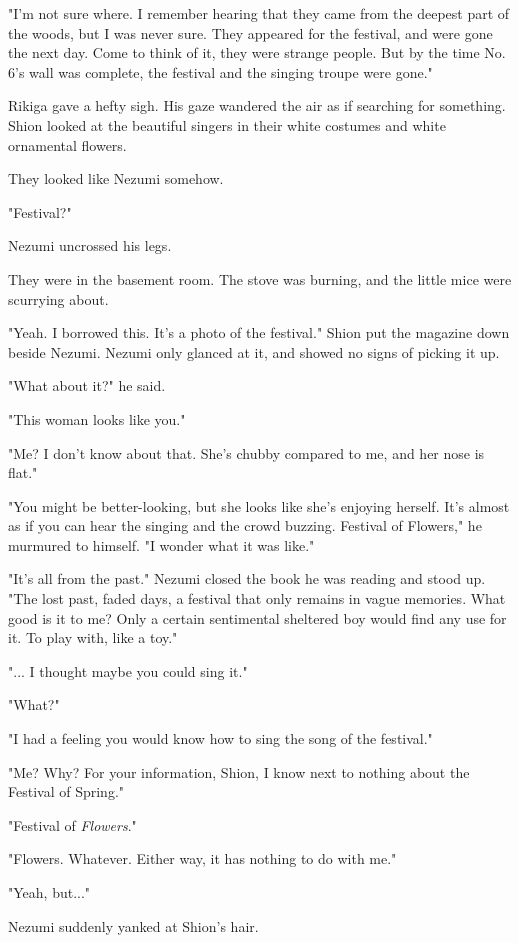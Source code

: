 "I'm not sure where. I remember hearing that they came from the deepest part of the woods, but I was never sure. They appeared for the festival, and were gone the next day. Come to think of it, they were strange people. But by the time No. 6's wall was complete, the festival and the singing troupe were gone."

Rikiga gave a hefty sigh. His gaze wandered the air as if searching for something. Shion looked at the beautiful singers in their white costumes and white ornamental flowers.

They looked like Nezumi somehow.

\myspace

"Festival?"

Nezumi uncrossed his legs.

They were in the basement room. The stove was burning, and the little mice were scurrying about.

"Yeah. I borrowed this. It's a photo of the festival." Shion put the magazine down beside Nezumi. Nezumi only glanced at it, and showed no signs of picking it up.

"What about it?" he said.

"This woman looks like you."

"Me? I don't know about that. She's chubby compared to me, and her nose is flat."

"You might be better-looking, but she looks like she's enjoying herself. It's almost as if you can hear the singing and the crowd buzzing. Festival of Flowers," he murmured to himself. "I wonder what it was like."

"It's all from the past." Nezumi closed the book he was reading and stood up. "The lost past, faded days, a festival that only remains in vague memories. What good is it to me? Only a certain sentimental sheltered boy would find any use for it. To play with, like a toy."

"... I thought maybe you could sing it."

"What?"

"I had a feeling you would know how to sing the song of the festival."

"Me? Why? For your information, Shion, I know next to nothing about the Festival of Spring."

"Festival of \emph{Flowers}."

"Flowers. Whatever. Either way, it has nothing to do with me."

"Yeah, but..."

Nezumi suddenly yanked at Shion's hair.

